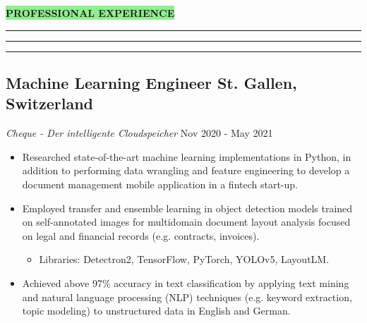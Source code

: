\documentclass{resume}
\renewenvironment{rSection}[1]{
\sectionskip
\vspace{-3.5pt}
\colorbox{lightGreen}{\hspace{-3pt}\MakeUppercase{\large{\textbf{#1}}}}
\vspace{3pt}
\hrule
\hrule
\hrule
\begin{list}{}{
\setlength{\leftmargin}{1.5em}
}
\item[]
}{
\end{list}
}
\begin{document}
\vspace{2pt}
\begin{rSection}{Professional Experience}

\begin{adjustwidth}{-6mm}{0pt}
\vspace{-5pt}
\subsection*{Machine Learning Engineer \hfill \normalsize{St. Gallen, Switzerland}}
\vspace{-7pt}
\textit{Cheque - Der intelligente Cloudspeicher} \hfill Nov 2020 - May 2021
\end{adjustwidth}
\begin{adjustwidth}{-6.5mm}{0pt}

\begin{itemize}

    \item Researched state-of-the-art machine learning implementations in Python, in addition to performing data wrangling and feature engineering to develop a document management mobile application in a fintech start-up.
    
    \item Employed transfer and ensemble learning in object detection models trained on self-annotated images for multidomain document layout analysis focused on legal and financial records (e.g. contracts, invoices).
    
    \begin{itemize}
    \vspace{-5pt}
        \item Libraries: Detectron2, TensorFlow, PyTorch, YOLOv5, LayoutLM.
    \end{itemize}

    \item Achieved above 97$\%$ accuracy in text classification by applying text mining and natural language processing (NLP) techniques (e.g. keyword extraction, topic modeling) to unstructured data in English and German.
    

\end{itemize}
\end{adjustwidth}
\end{rSection}
\end{document}
